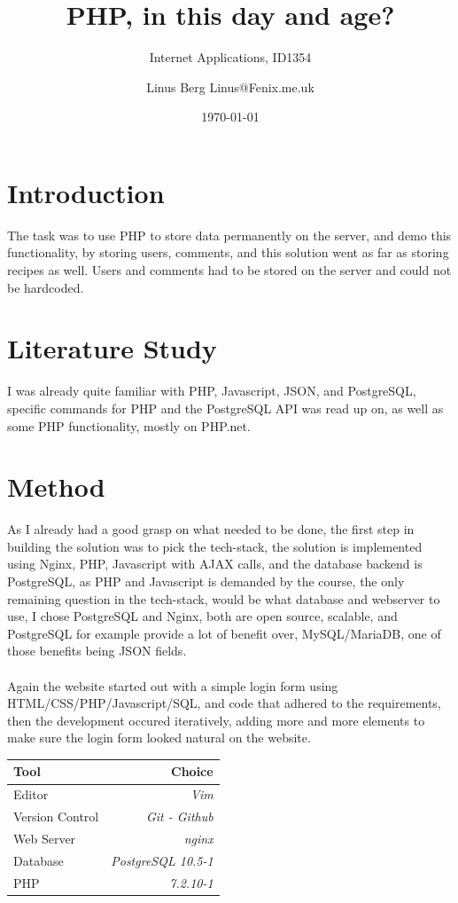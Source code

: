 \documentclass[a4paper]{scrartcl}
\title{PHP, in this day and age?}
\subtitle{Internet Applications, ID1354}
\author{Linus Berg Linus@Fenix.me.uk}
\date{\today}
\begin{document}
\maketitle

\section{Introduction}

\noindent
The task was to use PHP to store data permanently on the server, and demo this functionality,
by storing users, comments, and this solution went as far as storing recipes as well.
Users and comments had to be stored on the server and could not be hardcoded.
\section{Literature Study}
I was already quite familiar with PHP, Javascript, JSON, and PostgreSQL, specific
commands for PHP and the PostgreSQL API was read up on, as well as some 
PHP functionality, mostly on PHP.net.

\section{Method}

\noindent
As I already had a good grasp on what needed to be done, the first step in building the solution was to pick the tech-stack,
the solution is implemented using Nginx, PHP, Javascript with AJAX calls, and the database backend
is PostgreSQL, as PHP and Javascript is demanded by the course, the only remaining question in the tech-stack,
would be what database and webserver to use,
I chose PostgreSQL and Nginx, both are open source, scalable, and PostgreSQL for example provide a lot of benefit over,
MySQL/MariaDB, one of those benefits being JSON fields.
\\\\
Again the website started out with a simple login form
using HTML/CSS/PHP/Javascript/SQL, and
code that adhered to the requirements, then the development
occured iteratively, adding more and more elements to make
sure the login form looked natural on the website.
\begin{center}
    \begin{tabular}{  l | r }
    Tool & Choice \\ 
    \hline
    Editor & \textit{Vim}\\
    Version Control & \textit{Git - Github}\\
    Web Server & \textit{nginx}\\
    Database & \textit{PostgreSQL 10.5-1}\\
    PHP & \textit{7.2.10-1} \\
    \end{tabular}
\end{center}
\noindent
\end{document}
